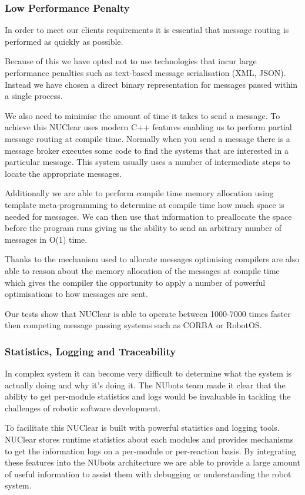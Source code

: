\documentclass[english,12pt]{scrartcl}
\begin{document}
			\subsubsection{Low Performance Penalty}
				In order to meet our clients requirements it is essential that message routing is performed as quickly as possible.

				Because of this we have opted not to use technologies that incur large performance penalties such as text-based message serialisation (XML, JSON).
				Instead we have chosen a direct binary representation for messages passed within a single process.

				We also need to minimise the amount of time it takes to send a message.
				To achieve this NUClear uses modern C++ features enabling us to perform partial message routing at compile time.
				Normally when you send a message there is a message broker executes some code to find the systems that are interested in a particular message.
				This system usually uses a number of intermediate steps to locate the appropriate messages.

				Additionally we are able to perform compile time memory allocation using template meta-programming to determine at compile time how much space is needed for messages.
				We can then use that information to preallocate the space before the program runs giving us the ability to send an arbitrary number of messages in O(1) time.

				Thanks to the mechanism used to allocate messages optimising compilers are also able to reason about the memory allocation of the messages at compile time which gives the compiler the opportunity to apply a number of powerful optimisations to how messages are sent.

				Our tests show that NUClear is able to operate between 1000-7000 times faster then competing message passing systems such as CORBA or RobotOS.

			\subsubsection{Statistics, Logging and Traceability}
				In complex system it can become very difficult to determine what the system is actually doing and why it's doing it.
				The NUbots team made it clear that the ability to get per-module statistics and logs would be invaluable in tackling the challenges of robotic software development.

				To facilitate this NUClear is built with powerful statistics and logging tools.
				NUClear stores runtime statistics about each modules and provides mechanisms to get the information logs on a per-module or per-reaction basis.
				By integrating these features into the NUbots architecture we are able to provide a large amount of useful information to assist them with debugging or understanding the robot system.
\end{document}
